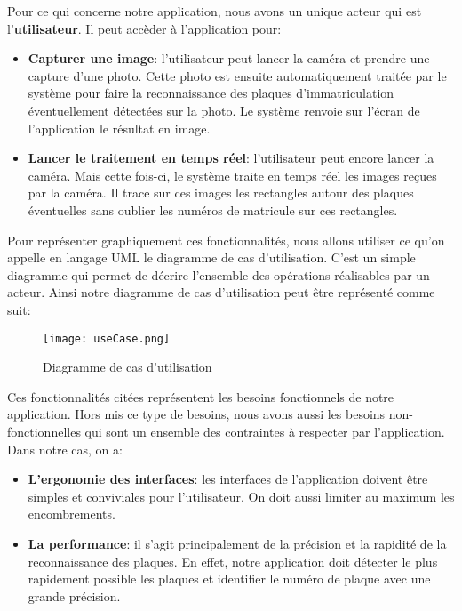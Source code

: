     Pour ce qui concerne notre application, nous avons un unique acteur qui est l’\textbf{utilisateur}. Il peut accèder à l'application pour:
    \begin{itemize}
        \item \textbf{Capturer une image}: l’utilisateur peut lancer la caméra et prendre une capture d’une photo. Cette photo est ensuite automatiquement traitée par le système pour faire la reconnaissance des plaques d’immatriculation éventuellement détectées sur la photo. Le système renvoie sur l’écran de l’application le résultat en image.
        \item \textbf{Lancer le traitement en temps réel}: l’utilisateur peut encore lancer la caméra. Mais cette fois-ci, le système traite en temps réel les images reçues par la caméra. Il trace sur ces images les rectangles autour des plaques éventuelles sans oublier les numéros de matricule sur ces rectangles.
    \end{itemize}
    Pour représenter graphiquement ces fonctionnalités, nous allons utiliser ce qu’on appelle en langage UML le diagramme de cas d’utilisation. C’est un simple diagramme qui permet de décrire l’ensemble des opérations réalisables par un acteur. Ainsi notre diagramme de cas d’utilisation peut être représenté comme suit:
    \begin{figure}[H]
        \centering
        \texttt{[image: useCase.png]}
        \caption{Diagramme de cas d'utilisation}
    \end{figure}
    Ces fonctionnalités citées représentent les besoins fonctionnels de notre application. Hors mis ce type de besoins, nous avons aussi les besoins non-fonctionnelles qui sont un ensemble des contraintes à respecter par l'application. Dans notre cas, on a:
    \begin{itemize}
        \item \textbf{L'ergonomie des interfaces}: les interfaces de l'application doivent être simples et conviviales pour l'utilisateur. On doit aussi limiter au maximum les encombrements.
        \item \textbf{La performance}: il s'agit principalement de la précision et la rapidité de la reconnaissance des plaques. En effet, notre application doit détecter le plus rapidement possible les plaques et identifier le numéro de plaque avec une grande précision. 
    \end{itemize}

